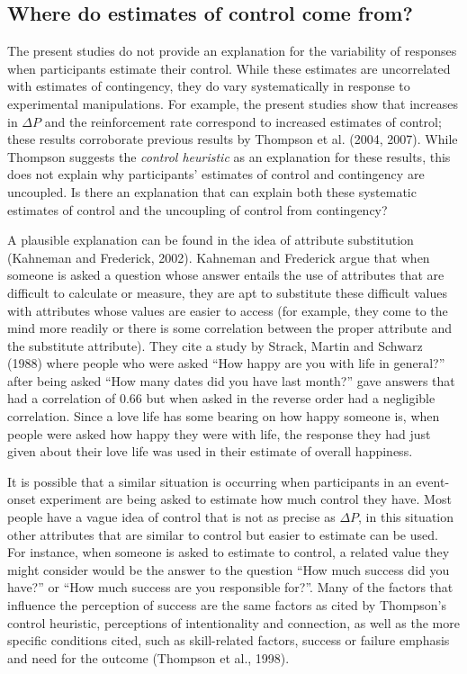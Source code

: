 \documentclass[USenglish,letterpaper,12pt,extrafontsizes,oneside,onecolumn,final]{memoir}
\newcommand{\deltap}{$\Delta P$}
\begin{document}
\subsection{Where do estimates of control come from?}

The present studies do not provide an explanation for the variability of responses when participants estimate their control.  While these estimates are uncorrelated with estimates of contingency, they do vary systematically in response to experimental manipulations.  For example, the present studies show that increases in \deltap \xspace and the reinforcement rate correspond to increased estimates of control; these results corroborate previous results by Thompson et al. (2004, 2007).  While Thompson suggests the \emph{control heuristic} as an explanation for these results, this does not explain why participants' estimates of control and contingency are uncoupled.  Is there an explanation that can explain both these systematic estimates of control and the uncoupling of control from contingency?

A plausible explanation can be found in the idea of attribute substitution (Kahneman and Frederick, 2002). Kahneman and Frederick argue that when someone is asked a question whose answer entails the use of attributes that are difficult to calculate or measure, they are apt to substitute these difficult values with attributes whose values are easier to access (for example, they come to the mind more readily or there is some correlation between the proper attribute and the substitute attribute). They cite a study by Strack, Martin and Schwarz (1988) where people who were asked ``How happy are you with life in general?'' after being asked ``How many dates did you have last month?'' gave answers that had a correlation of 0.66 but when asked in the reverse order had a negligible correlation.  Since a love life has some bearing on how happy someone is, when people were asked how happy they were with life, the response they had just given about their love life was used in their estimate of overall happiness.  

It is possible that a similar situation is occurring when participants in an event-onset experiment are being asked to estimate how much control they have.  Most people have a vague idea of control that is not as precise as \deltap, in this situation other attributes that are similar to control but easier to estimate can be used.  For instance, when someone is asked to estimate to control, a related value they might consider would be the answer to the question ``How much success did you have?'' or ``How much success are you responsible for?''. Many of the factors that influence the perception of success are the same factors as cited by Thompson's control heuristic, perceptions of intentionality and connection, as well as the more specific conditions cited, such as skill-related factors, success or failure emphasis and need for the outcome (Thompson et al., 1998).
\end{document}
